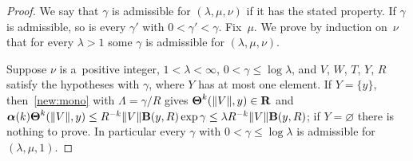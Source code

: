 \begin{proof}
    We say that $\gamma$ is admissible for $(\lambda,\mu,\nu)$ if it has the stated property. If
    $\gamma$ is admissible, so is every $\gamma'$ with $0 < \gamma' < \gamma$. Fix~$\mu$. We prove
    by induction on~$\nu$ that for every $\lambda > 1$ some $\gamma$ is admissible for
    $(\lambda,\mu,\nu)$.

    Suppose $\nu$ is a~positive integer, $1 < \lambda < \infty$, $0 < \gamma \le \log \lambda$,
    and $V$, $W$, $T$, $Y$, $R$ satisfy the hypotheses with $\gamma$, where $Y$ has at most one
    element. If $Y = \{ y \}$, then~\ref{new:mono} with $\Lambda = \gamma / R$ gives
    $\boldsymbol{\Theta}^{k}(\|V\|,y) \in \mathbf{R}$ and $\boldsymbol{\alpha}(k) \boldsymbol{\Theta}^{k}(\|V\|,y) \le
    R^{-k} \|V\| \mathbf{B}(y,R) \exp \gamma \le \lambda R^{-k} \|V\| \mathbf{B}(y,R)$; if $Y =
    \varnothing$ there is nothing to prove. In particular every $\gamma$ with $0 < \gamma \le \log
    \lambda$ is admissible for $(\lambda,\mu,1)$.


\end{proof}
